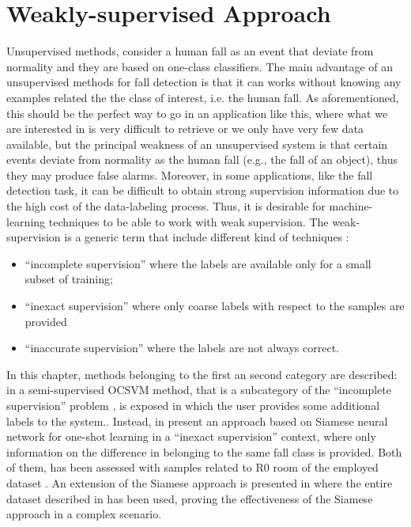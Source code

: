 \chapter{Weakly-supervised Approach}
\label{ch:weakley_supervised}
Unsupervised methods, consider a human fall as an event that deviate from normality and they are based on one-class classifiers. The main advantage of an unsupervised methods for fall detection is that it can works without knowing any examples related the the class of interest, i.e. the human fall. As aforementioned, this should be the perfect way to go in an application like this, where what we are interested in is very difficult to retrieve or we only have very few data available, but the principal weakness of an unsupervised system is that certain events deviate from normality as the human fall (e.g., the fall of an object), thus they may produce false alarms.
Moreover, in some applications, like the fall detection task, it can be difficult to obtain
strong supervision information due to the high cost of the data-labeling process. Thus, it is desirable for machine-learning techniques to be able to work with weak supervision.
The weak-supervision is a generic term that include different kind of techniques \cite{zhou2017brief}:
\begin{itemize}
	\item ``incomplete supervision'' where the labels are available only for a small subset of training;	
	\item ``inexact supervision'' where only coarse labels with respect to the samples are provided
	\item ``inaccurate supervision'' where the labels are not always correct.
\end{itemize}

In this chapter, methods belonging to the first an second category are described: in  a semi-supervised OCSVM method, that is a subcategory of the ``incomplete supervision'' problem  \cite{zhou2017brief},  is exposed in which the user provides some additional labels to the system.. Instead, in  present an approach based on Siamese neural network for one-shot learning in a ``inexact supervision'' context, where only information on the difference in belonging to the same fall class is provided. Both of them, has been assessed with samples related to R0 room of the employed dataset . An extension of the Siamese approach is presented in  where the entire dataset described in  has been used, proving the effectiveness of the Siamese approach in a complex scenario.




